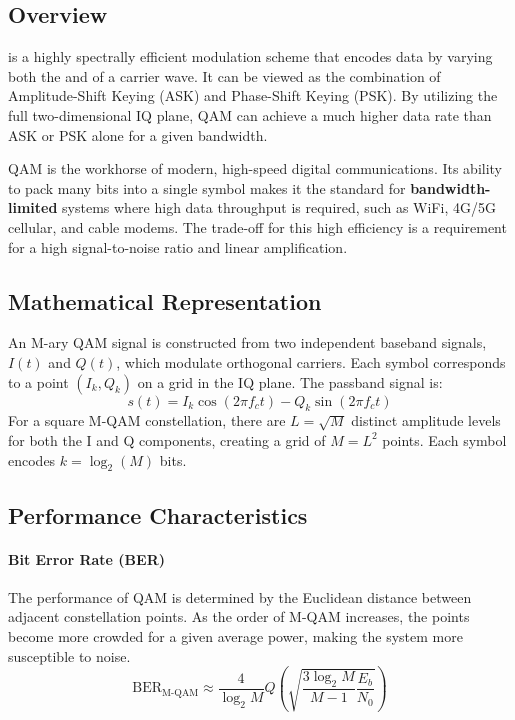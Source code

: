\subsection{Overview}

 is a highly spectrally efficient modulation scheme that encodes data by varying both the  and  of a carrier wave. It can be viewed as the combination of Amplitude-Shift Keying (ASK) and Phase-Shift Keying (PSK). By utilizing the full two-dimensional IQ plane, QAM can achieve a much higher data rate than ASK or PSK alone for a given bandwidth.

\begin{keyconcept}
    QAM is the workhorse of modern, high-speed digital communications. Its ability to pack many bits into a single symbol makes it the standard for \textbf{bandwidth-limited} systems where high data throughput is required, such as WiFi, 4G/5G cellular, and cable modems. The trade-off for this high efficiency is a requirement for a high signal-to-noise ratio and linear amplification.
\end{keyconcept}


\subsection{Mathematical Representation}

An M-ary QAM signal is constructed from two independent baseband signals, $I(t)$ and $Q(t)$, which modulate orthogonal carriers. Each symbol corresponds to a point $(I_k, Q_k)$ on a grid in the IQ plane. The passband signal is:
\begin{equation}
    s(t) = I_k \cos(2\pi f_c t) - Q_k \sin(2\pi f_c t)
\end{equation}
For a square M-QAM constellation, there are $L = \sqrt{M}$ distinct amplitude levels for both the I and Q components, creating a grid of $M=L^2$ points. Each symbol encodes $k = \log_2(M)$ bits.


\subsection{Performance Characteristics}

\paragraph{Bit Error Rate (BER)}
The performance of QAM is determined by the Euclidean distance between adjacent constellation points. As the order of M-QAM increases, the points become more crowded for a given average power, making the system more susceptible to noise.
\begin{equation}
    \text{BER}_{\text{M-QAM}} \approx \frac{4}{\log_2 M} Q\left(\sqrt{\frac{3\log_2 M}{M-1} \frac{E_b}{N_0}}\right)
\end{equation}

